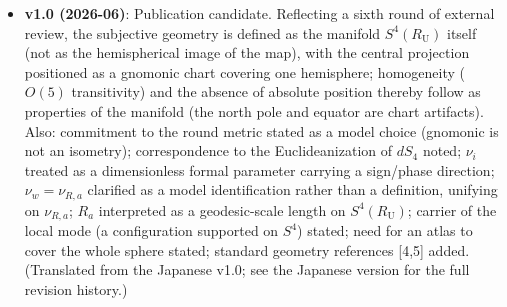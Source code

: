 \documentclass[
]{article}
\providecommand{\tightlist}{%
  \setlength{\itemsep}{0pt}\setlength{\parskip}{0pt}}
\begin{document}
\begin{itemize}
\tightlist
\item
  \textbf{v1.0 (2026-06)}: Publication candidate. Reflecting a sixth
  round of external review, the subjective geometry is defined as the
  manifold \(S^4(R_{\mathrm U})\) itself (not as the hemispherical image
  of the map), with the central projection positioned as a gnomonic
  chart covering one hemisphere; homogeneity (\(O(5)\) transitivity) and
  the absence of absolute position thereby follow as properties of the
  manifold (the north pole and equator are chart artifacts). Also:
  commitment to the round metric stated as a model choice (gnomonic is
  not an isometry); correspondence to the Euclideanization of \(dS_4\)
  noted; \(\nu_i\) treated as a dimensionless formal parameter carrying
  a sign/phase direction; \(\nu_w=\nu_{R,a}\) clarified as a model
  identification rather than a definition, unifying on \(\nu_{R,a}\);
  \(R_a\) interpreted as a geodesic-scale length on
  \(S^4(R_{\mathrm U})\); carrier of the local mode (a configuration
  supported on \(S^4\)) stated; need for an atlas to cover the whole
  sphere stated; standard geometry references {[}4,5{]} added.
  (Translated from the Japanese v1.0; see the Japanese version for the
  full revision history.)
\end{itemize}
\end{document}

